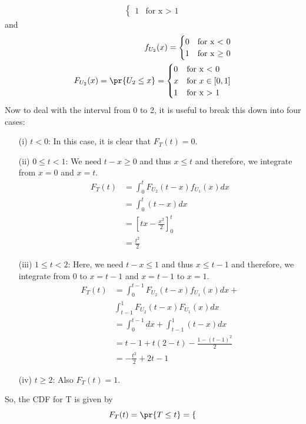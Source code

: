 \documentclass[journal,12pt,twocolumn]{IEEEtran}
\renewcommand\thesection{\arabic{section}}
\begin{document}
\begin{enumerate}[label=\thesection.\arabic*
,ref=\thesection.\theenumi]
\begin{align*}
\begin{cases}
      1 & \text{for x $>$ 1}
    \end{cases}       
\end{align*} and 
\begin{align*}
f_{U_2}(x)=
	 \begin{cases}
    0 & \text{for x $<$ 0}\\
      1 & \text{for x $\geq$ 0}
    \end{cases}
     \\
  F_{U_2}(x)=\pr{U_2 \le x} =
    \begin{cases}
    0 & \text{for x $<$ 0}\\
      x & \text{for}~x\in [0,1]\\
      1 & \text{for x $>$ 1}
    \end{cases}  
\end{align*}
Now to deal with the interval from 0 to 2, it is useful to break this down into four cases:
\begin{enumerate}
\item[(i)] $t < 0$: In this case, it is clear that $F_T(t) = 0$.
\item[(ii)] $0 \leq t < 1$: We need $t-x\geq 0$ and thus $x\leq t$ and therefore, we integrate from $x=0$ and $x=t$. 
\begin{align*}
F_T(t)&=\int_{0}^{t}F_{U_2}(t - x)f_{U_1}(x)dx\\
&=\int_{0}^{t}(t - x)dx\\
&=\left[tx-\frac{x^2}{2}\right]_0^t\\
&=\frac{t^2}{2}
\end{align*}
\item[(iii)] $1 \leq t < 2$: Here, we need $t-x\leq 1$ and thus $x\leq t-1$ and therefore, we integrate from $0$ to $x=t-1$ and $x=t-1$ to $x=1$. 
\begin{align*}
F_T(t)&=\int_{0}^{t-1}F_{U_2}(t - x)f_{U_1}(x)dx +\\
&\int_{t-1}^{1}F_{U_2}(t - x)F_{U_1}(x)dx\\
&= \int_{0}^{t - 1}dx + \int_{t - 1}^{1}(t - x)dx \\
&= t - 1 + t(2 - t) - \frac{1 - (t - 1)^2}{2} \\
&= -\frac{t^2}{2} + 2t - 1
\end{align*}
\item[(iv)] $t \geq 2$: Also $F_T(t) = 1$.
\end{enumerate}
So, the CDF for T is given by 
\begin{equation}
F_{T}(t)=\pr{T \le t} =
    \begin{cases}

\end{cases}
\end{equation}
\end{enumerate}
\end{document}
